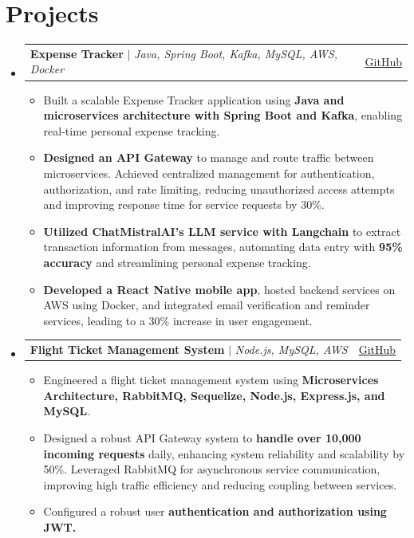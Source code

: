 \documentclass[a4paper,11pt]{article}
\makeatletter
\newcommand{\resumeItem}[1]{
  \item\small{
    {#1 \vspace{-2pt}}
  }
}
\newcommand{\resumeProjectHeading}[2]{
    \item
    \begin{tabular*}{0.97\textwidth}{l@{\extracolsep{\fill}}r}
      \small#1 & #2 \\
    \end{tabular*}\vspace{-7pt}
}
\newcommand{\resumeItemListStart}{\begin{itemize}}
\newcommand{\resumeItemListEnd}{\end{itemize}\vspace{-5pt}}
\makeatother
\begin{document}
\noindent\section*{Projects}
    \begin{itemize}[leftmargin=0.15in, label={}]
    \resumeProjectHeading
        {\textbf{Expense Tracker} $|$ \emph{Java, Spring Boot, Kafka, MySQL, AWS, Docker}}{\href{https://github.com/ubednama/Expense-Tracker-Authservice}{\underline{GitHub}}}
            \resumeItemListStart
                \resumeItem{Built a scalable Expense Tracker application using \textbf{Java and microservices architecture with Spring Boot and Kafka}, enabling real-time personal expense tracking.}
                \resumeItem{\textbf{Designed an API Gateway} to manage and route traffic between microservices. Achieved centralized
management for authentication, authorization, and rate limiting, reducing unauthorized access attempts and
improving response time for service requests by 30\%.}
                \resumeItem{\textbf{Utilized ChatMistralAI’s LLM service with Langchain} to extract transaction information from messages, automating data entry with \textbf{95\% accuracy} and streamlining personal expense tracking.}
                \resumeItem{\textbf{Developed a React Native mobile app}, hosted backend services on AWS using Docker, and integrated email verification and reminder services, leading to a 30\% increase in user engagement.}
            \resumeItemListEnd
        
    \resumeProjectHeading
      {\textbf{Flight Ticket Management System} $|$ \emph{Node.js, MySQL, AWS}}{\href{https://github.com/ubednama/Flights-Service} {\underline{GitHub}}}
      \resumeItemListStart
        \resumeItem{Engineered a flight ticket management system using \textbf{Microservices Architecture, RabbitMQ, Sequelize, Node.js, Express.js, and MySQL}.}
        \resumeItem{Designed a robust API Gateway system to \textbf{handle over 10,000 incoming requests} daily, enhancing system reliability and scalability by 50\%. Leveraged RabbitMQ for asynchronous service communication, improving high traffic efficiency and reducing coupling between services.}
        \resumeItem{Configured a robust user \textbf{authentication and authorization using JWT.}}
      \resumeItemListEnd
      

\end{itemize}
\end{document}
